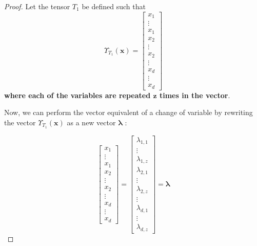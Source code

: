 \documentclass{article}
\theoremstyle{definition}
\theoremstyle{definition}
\begin{document}
\begin{proof}
Let the tensor $T_1$ be defined such that
\begin{equation}
    \Upsilon_{T_1}(\mathbf{x})
    = 
    \begin{bmatrix}
            x_1   \\
            \vdots  \\
            x_1 \\
            x_2 \\
            \vdots \\
            x_2 \\
            \vdots \\
            x_d  \\
            \vdots  \\
            x_d 
    \end{bmatrix}
\end{equation}
{\bf where each of the variables are repeated $\bm{z}$ times in the vector}.

Now, we can perform the vector equivalent of a change of variable by rewriting the vector $\Upsilon_{T_1}(\mathbf{x})$ as a new vector $\bm{\lambda}$ :

\begin{equation} \label{lambda}
    \begin{bmatrix}
        x_1   \\
        \vdots  \\
        x_1 \\
        x_2 \\
        \vdots \\
        x_2 \\
        \vdots \\
        x_d   \\
        \vdots  \\
        x_d
\end{bmatrix}
    =
    \begin{bmatrix}
        \lambda_{1, 1} \\
        \vdots \\
        \lambda_{1, z} \\
        \lambda_{2, 1} \\
        \vdots \\
        \lambda_{2, z} \\
        \vdots \\
        \lambda_{d, 1} \\
        \vdots \\
        \lambda_{d, z} 
    \end{bmatrix}
    = \bm{\lambda}
\end{equation}


\end{proof}
\end{document}
